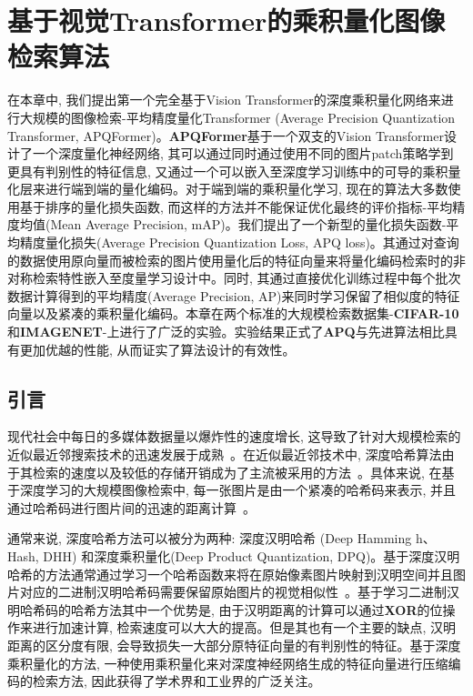 \chapter{基于视觉Transformer的乘积量化图像检索算法}
在本章中, 我们提出第一个完全基于Vision Transformer的深度乘积量化网络来进行大规模的图像检索-平均精度量化Transformer (Average Precision Quantization Transformer, APQFormer)。\textbf{APQFormer}基于一个双支的Vision Transformer设计了一个深度量化神经网络, 其可以通过同时通过使用不同的图片patch策略学到更具有判别性的特征信息, 又通过一个可以嵌入至深度学习训练中的可导的乘积量化层来进行端到端的量化编码。对于端到端的乘积量化学习, 现在的算法大多数使用基于排序的量化损失函数, 而这样的方法并不能保证优化最终的评价指标-平均精度均值(Mean Average Precision, mAP)。我们提出了一个新型的量化损失函数-平均精度量化损失(Average Precision Quantization Loss, APQ loss)。其通过对查询的数据使用原向量而被检索的图片使用量化后的特征向量来将量化编码检索时的非对称检索特性嵌入至度量学习设计中。同时, 其通过直接优化训练过程中每个批次数据计算得到的平均精度(Average Precision, AP)来同时学习保留了相似度的特征向量以及紧凑的乘积量化编码。本章在两个标准的大规模检索数据集-\textbf{CIFAR-10}和\textbf{IMAGENET}-上进行了广泛的实验。实验结果正式了\textbf{APQ}与先进算法相比具有更加优越的性能, 从而证实了算法设计的有效性。
\section{引言}
现代社会中每日的多媒体数据量以爆炸性的速度增长, 这导致了针对大规模检索的近似最近邻搜索技术的迅速发展于成熟~\cite{andoni2006near,shrivastava2014densifying, malkov2018efficient, nie2020deep, li2021dahp}。在近似最近邻技术中, 深度哈希算法由于其检索的速度以及较低的存储开销成为了主流被采用的方法~\cite{zhu2016deep, jiang2018asymmetric, zhang2019improved, cao2017hashnet}。具体来说, 在基于深度学习的大规模图像检索中, 每一张图片是由一个紧凑的哈希码来表示, 并且通过哈希码进行图片间的迅速的距离计算~\cite{jang2020generalized}。\par
通常来说, 深度哈希方法可以被分为两种: 深度汉明哈希 (Deep Hamming h、Hash, DHH) 和深度乘积量化(Deep Product Quantization, DPQ)。基于深度汉明哈希的方法通常通过学习一个哈希函数来将在原始像素图片映射到汉明空间并且图片对应的二进制汉明哈希码需要保留原始图片的视觉相似性~\cite{zhu2016deep,zhang2019improved, cao2017hashnet, cao2018deep, fan2020deep}。基于学习二进制汉明哈希码的哈希方法其中一个优势是, 由于汉明距离的计算可以通过\textbf{XOR}的位操作来进行加速计算, 检索速度可以大大的提高。但是其也有一个主要的缺点, 汉明距离的区分度有限, 会导致损失一大部分原特征向量的有判别性的特征。基于深度乘积量化的方法, 一种使用乘积量化来对深度神经网络生成的特征向量进行压缩编码的检索方法, 因此获得了学术界和工业界的广泛关注。\par

